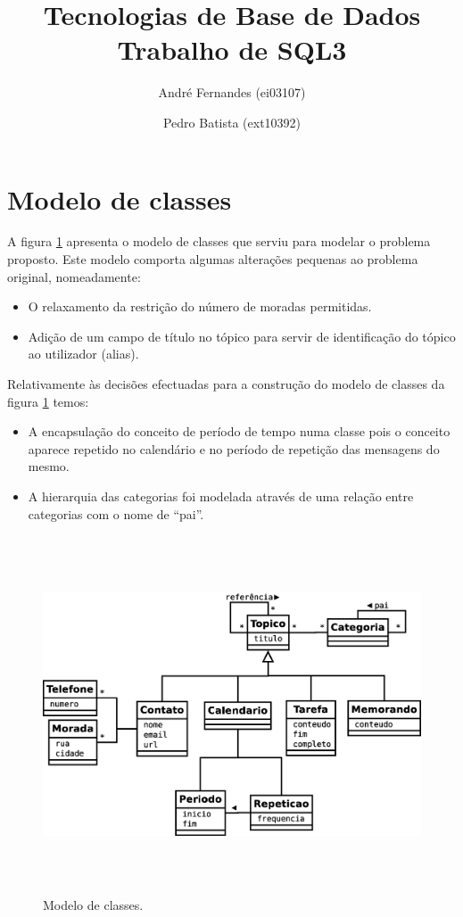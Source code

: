 \documentclass[a4paper,12pt]{article}
\title{Tecnologias de Base de Dados\\
\Large{Trabalho de SQL3}}
\author{André Fernandes (ei03107) \and Pedro Batista (ext10392)}
\begin{document}
\maketitle

\section{Modelo de classes}

	A figura \ref{fig:classes} apresenta o modelo de classes que serviu para modelar o problema proposto. Este modelo comporta algumas alterações pequenas ao problema original, nomeadamente:

	\begin{itemize}
		\item O relaxamento da restrição do número de moradas permitidas. 	
		\item Adição de um campo de título no tópico para servir de identificação do tópico ao utilizador (alias).  
	\end{itemize}

	Relativamente às decisões efectuadas para a construção do modelo de classes da  figura \ref{fig:classes} temos:

	\begin{itemize}
		\item A encapsulação do conceito de período de tempo numa classe pois o conceito aparece repetido no calendário e no período de repetição das mensagens do mesmo.
		\item A hierarquia das categorias foi modelada através de uma relação entre categorias com o nome de ``pai''. 
	\end{itemize}

	\begin{figure}[htp]
		\begin{center}
			\includegraphics[height=300pt]{uml}
		\end{center}
		\caption{Modelo de classes.}
		\label{fig:classes}
	\end{figure}
\end{document}
